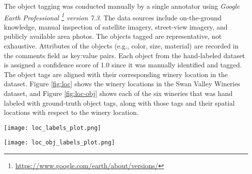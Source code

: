 The object tagging was conducted manually by a single annotator using \textit{Google Earth Professional \footnote{\href{https://www.google.com/earth/about/versions/}{https://www.google.com/earth/about/versions/}} version 7.3}. 
The data sources include on-the-ground knowledge, manual inspection of satellite imagery, street-view imagery, and publicly available area photos. 
The objects tagged are representative, not exhaustive. 
Attributes of the objects (e.g., color, size, material) are recorded in the comments field as key:value pairs.
Each object from the hand-labeled dataset is assigned a confidence score of 1.0 since it was manually identified and tagged.
The object tags are aligned with their corresponding winery location in the dataset.
Figure \ref{fig:loc} shows the winery locations in the Swan Valley Wineries dataset, and Figure \ref{fig:loc-obj} shows each of the six wineries that was hand labeled with ground-truth object tags, along with those tags and their spatial locations with respect to the winery location.



\begin{figure*}[ht]       
    \texttt{[image: loc\_labels\_plot.png]}
    \centering
    \caption[width=\textwidth]{The Swan Valley Wineries dataset has six locations with annotated objects and another 30 without manually annotated objects but with confirmed location coordinates.}
    \label{fig:loc} 
\end{figure*}


\begin{figure*}[ht]
    \texttt{[image: loc\_obj\_labels\_plot.png]}
    \centering
    \caption[width=\textwidth]{A representative view of the six wineries in the dataset shows the geospatial heterogeneity of object positions between locations.}
    \label{fig:loc-obj}  
\end{figure*}


